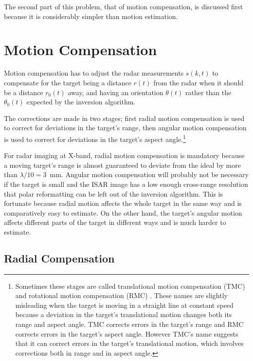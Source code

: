 The second part of this problem, that of motion compensation, is discussed
first because it is considerably simpler than motion estimation.

\section{Motion Compensation}


Motion compensation has to adjust the radar measurements $s(k,t)$ to
compensate for the target being a distance $r(t)$ from the radar when it
should be a distance $r_0(t)$ away, and having an orientation $\theta(t)$
rather than the $\theta_0(t)$ expected by the inversion algorithm.  

The corrections are made in two stages; first radial motion compensation is
used to correct for deviations in the target's range, then angular motion
compensation is used to correct for deviations in the target's aspect
angle.\footnote{Sometimes these stages are called translational motion
compensation (TMC) and rotational motion compensation (RMC)
\protect\cite{Boc91}.  These names are slightly misleading when the target
is moving in a straight line at constant speed because a deviation in the
target's translational motion changes both its range and aspect angle.  TMC
corrects errors in the target's range and RMC corrects errors in the
target's aspect angle.  However TMC's name suggests that it can correct
errors in the target's translational motion, which involves corrections  
both in range and in aspect angle.}

For radar imaging at X-band, radial motion compensation is mandatory because
a moving target's range is almost guaranteed to deviate from the ideal by
more than $\lambda/10=3$~mm.  Angular motion compensation will probably not
be necessary if the target is small and the ISAR image has a low enough
cross-range resolution that polar reformatting can be left out of the
inversion algorithm.  This is fortunate because radial motion affects the
whole target in the same way and is comparatively easy to estimate.  On the
other hand, the target's angular motion affects different parts of the
target in different ways and is much harder to estimate.


\subsection{Radial Compensation}
\label{mc sec:rc}

